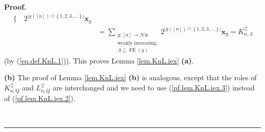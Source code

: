 \documentclass[numbers=enddot,12pt,final,onecolumn,notitlepage]{scrartcl}%
\theoremstyle{definition}
\newenvironment{proof}[1][Proof]{\noindent\textbf{#1.} }{\ \rule{0.5em}{0.5em}}
\newenvironment{vershort}{}{}
\let\sumnonlimits\sum
\renewcommand{\sum}{\sumnonlimits\limits}
\begin{document}
\begin{proof}
\begin{align*}
\begin{cases}
\end{cases}
2^{\left\vert g\left(  \left[  n\right]  \right)  \cap\left\{  1,2,3,\ldots
\right\}  \right\vert }\mathbf{x}_{g}\\
&  =\sum_{\substack{g:\left[  n\right]  \rightarrow\mathcal{N}\text{
is}\\\text{weakly increasing;}\\\Lambda\subseteq\operatorname*{FE}\left(
g\right)  }}2^{\left\vert g\left(  \left[  n\right]  \right)  \cap\left\{
1,2,3,\ldots\right\}  \right\vert }\mathbf{x}_{g}=K_{n,\Lambda}^{\mathcal{Z}}%
\end{align*}
(by (\ref{eq.def.KnL.1})). This proves Lemma \ref{lem.KnL.iex} \textbf{(a)}.

\begin{vershort}
\textbf{(b)} The proof of Lemma \ref{lem.KnL.iex} \textbf{(b)} is analogous,
except that the roles of $K_{n,Q}^{\mathcal{Z}}$ and $L_{n,Q}^{\mathcal{Z}}$
are interchanged and we need to use (\ref{pf.lem.KnL.iex.3}) instead of
(\ref{pf.lem.KnL.iex.2}).
\end{vershort}


\end{proof}
\end{document}

